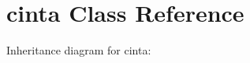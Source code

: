 \hypertarget{classcinta}{}\section{cinta Class Reference}
\label{classcinta}


Inheritance diagram for cinta\+:
